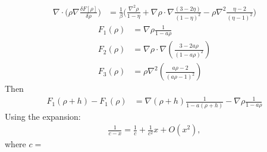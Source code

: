 \documentclass[11pt, a4paper]{article}
\theoremstyle{definition}
\begin{document}
\begin{align*}
	\nabla \cdot \bigg(\rho \nabla \frac{\delta F[\rho]}{\delta \rho}\bigg)
	&= \frac{1}{\beta} \bigg( \frac{\nabla^2 \rho}{1 - \eta} +  \nabla \rho \cdot \nabla \frac{(3- 2 \eta)}{(1 - \eta)^2}  - \rho \nabla^2\frac{\eta - 2}{(\eta - 1)^2} \bigg)
\end{align*}
\begin{align*}
	F_1(\rho) &= \nabla \rho \frac{1}{1- a\rho}\\
	F_2(\rho) &= \nabla \rho \cdot \nabla \left(\frac{3-2a\rho}{(1-a\rho)^2}\right)\\
	F_3(\rho) &= \rho \nabla^2 \left(\frac{a\rho -2}{(a\rho -1)^2}\right)
\end{align*}
Then
\begin{align*}
	F_1(\rho + h) - F_1(\rho) &= \nabla (\rho +h) \frac{1}{1- a(\rho +h)} - \nabla \rho \frac{1}{1- a\rho}
\end{align*}
Using the expansion: 
\begin{align*}
	\frac{1}{c - x} = \frac{1}{c} + \frac{1}{c^2}x + O(x^2),
\end{align*}
where $c = $
\end{document}
